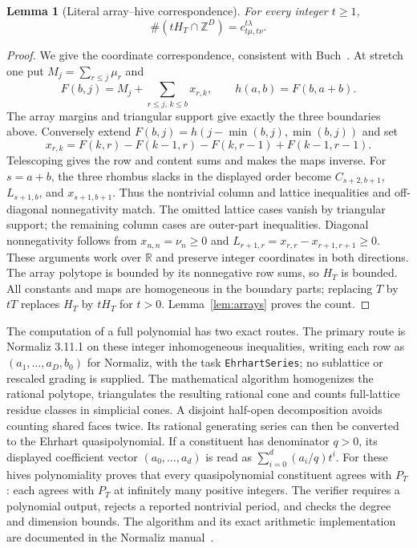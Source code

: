 \documentclass[11pt]{article}
\newtheorem{lemma}[theorem]{Lemma}
\begin{document}
\begin{lemma}[Literal array--hive correspondence]\label{lem:hivebinding}
For every integer $t\ge1$,
\[
 \#(tH_T\cap\mathbb Z^D)=c^{t\lambda}_{t\mu,t\nu}.
\]
\end{lemma}
\begin{proof}
We give the coordinate correspondence, consistent with
Buch~\cite[Theorem 1 and Fulton's appendix]{Buch}. At stretch one put
$M_j=\sum_{r\le j}\mu_r$ and
\[
 F(b,j)=M_j+\sum_{r\le j,\,k\le b}x_{r,k},\qquad
 h(a,b)=F(b,a+b).
\]
The array margins and triangular support give exactly the three
boundaries above. Conversely extend
$F(b,j)=h(j-\min(b,j),\min(b,j))$ and set
\[
 x_{r,k}=F(k,r)-F(k-1,r)-F(k,r-1)+F(k-1,r-1).
\]
Telescoping gives the row and content sums and makes the maps inverse.
For $s=a+b$, the three rhombus slacks in the displayed order become
$C_{s+2,b+1}$, $L_{s+1,b}$, and $x_{s+1,b+1}$.
Thus the nontrivial column and lattice inequalities and off-diagonal
nonnegativity match. The omitted lattice cases vanish by triangular
support; the remaining column cases are outer-part inequalities.
Diagonal nonnegativity follows from $x_{n,n}=\nu_n\ge0$ and
$L_{r+1,r}=x_{r,r}-x_{r+1,r+1}\ge0$. These arguments work over
$\mathbb R$ and preserve integer coordinates in both directions.
The array polytope is bounded by its nonnegative row sums, so $H_T$ is
bounded. All constants and maps are homogeneous in the boundary parts;
replacing $T$ by $tT$ replaces $H_T$ by $tH_T$ for $t>0$.
Lemma~\ref{lem:arrays} proves the count.
\end{proof}

The computation of a full polynomial has two exact routes.
The primary route is Normaliz 3.11.1 on these integer inhomogeneous
inequalities, writing each row as $(a_1,\ldots,a_D,b_0)$ for
Normaliz, with the task \texttt{EhrhartSeries}; no sublattice or
rescaled grading is supplied. The mathematical algorithm homogenizes
the rational polytope, triangulates the resulting rational cone and
counts full-lattice residue classes in simplicial cones. A disjoint
half-open decomposition avoids counting shared faces twice. Its rational
generating series can then be converted to the Ehrhart quasipolynomial.
If a constituent has denominator $q>0$, its displayed coefficient vector
$(a_0,\ldots,a_d)$ is read as $\sum_{i=0}^d(a_i/q)t^i$.
For these hives polynomiality proves that every quasipolynomial
constituent agrees with $P_T$: each agrees with $P_T$ at infinitely many
positive integers. The verifier requires a polynomial output, rejects a
reported nontrivial period, and checks the degree and dimension bounds.
The algorithm and its exact arithmetic implementation are documented
in the Normaliz manual~\cite{Normaliz}.
\end{document}
